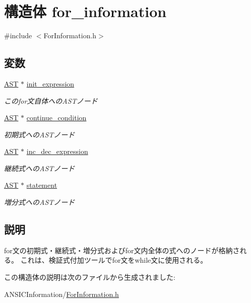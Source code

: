 \section{構造体 for\_\-information}
\label{structfor__information}


{\ttfamily \#include $<$ForInformation.h$>$}

\subsection*{変数}
\begin{DoxyCompactItemize}
\item 
\hyperlink{structabstract__syntax__tree}{AST} $\ast$ \hyperlink{structfor__information_a744fb3a7b36dfd65aafbc1a8e39c137d}{init\_\-expression}\label{structfor__information_a744fb3a7b36dfd65aafbc1a8e39c137d}

\begin{DoxyCompactList}\small\item\em このfor文自体へのASTノード \item\end{DoxyCompactList}\item 
\hyperlink{structabstract__syntax__tree}{AST} $\ast$ \hyperlink{structfor__information_a6fdc047d1c19f69e884c929688bf70e6}{continue\_\-condition}\label{structfor__information_a6fdc047d1c19f69e884c929688bf70e6}

\begin{DoxyCompactList}\small\item\em 初期式へのASTノード \item\end{DoxyCompactList}\item 
\hyperlink{structabstract__syntax__tree}{AST} $\ast$ \hyperlink{structfor__information_a694fedfacd9dab80421b098d5040f28d}{inc\_\-dec\_\-expression}\label{structfor__information_a694fedfacd9dab80421b098d5040f28d}

\begin{DoxyCompactList}\small\item\em 継続式へのASTノード \item\end{DoxyCompactList}\item 
\hyperlink{structabstract__syntax__tree}{AST} $\ast$ \hyperlink{structfor__information_ae8f8608451c0048194d39fec93fbcf8b}{statement}\label{structfor__information_ae8f8608451c0048194d39fec93fbcf8b}

\begin{DoxyCompactList}\small\item\em 増分式へのASTノード \item\end{DoxyCompactList}\end{DoxyCompactItemize}


\subsection{説明}
for文の初期式・継続式・増分式およびfor文内全体の式へのノードが格納される。 これは、検証式付加ツールでfor文をwhile文に使用される。 

この構造体の説明は次のファイルから生成されました:\begin{DoxyCompactItemize}
\item 
ANSICInformation/\hyperlink{ForInformation_8h}{ForInformation.h}\end{DoxyCompactItemize}
